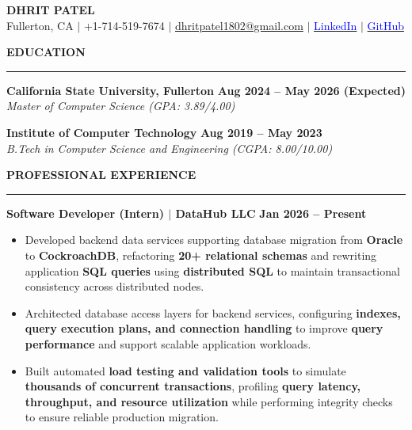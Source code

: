 \documentclass{article}
\begin{document}
\begin{center}
\thispagestyle{empty}

\large \textbf{DHRIT PATEL} \\
Fullerton, CA $\mid$ +1-714-519-7674 $\mid$
\href{mailto:dhritpatel1802@gmail.com}{dhritpatel1802@gmail.com} $\mid$
\href{https://www.linkedin.com/in/dhrit-patel-4a4135207/}{\textcolor{blue}{LinkedIn}} $\mid$
\href{https://github.com/d180}{\textcolor{blue}{GitHub}}

\end{center}

\noindent \textbf{EDUCATION} \vspace{-8pt} \\
\rule{\linewidth}{0.5pt}

\noindent \textbf{California State University, Fullerton} \hfill \textbf{Aug 2024 – May 2026 (Expected)} \\
\textit{Master of Computer Science (GPA: 3.89/4.00)}

\vspace{2mm}

\noindent \textbf{Institute of Computer Technology} \hfill \textbf{Aug 2019 – May 2023} \\
\textit{B.Tech in Computer Science and Engineering (CGPA: 8.00/10.00)}

\vspace{3mm}
\noindent \textbf{PROFESSIONAL EXPERIENCE} \vspace{-8pt} \\
\rule{\linewidth}{0.5pt}

{\large \noindent \textbf{Software Developer (Intern) $\mid$ DataHub LLC}} \hfill \textbf{Jan 2026 – Present}
\vspace{1mm}

{\small
\begin{itemize}[noitemsep, nolistsep, leftmargin=*, itemsep=1mm]

\item Developed backend data services supporting database migration from \textbf{Oracle} to \textbf{CockroachDB}, refactoring \textbf{20+ relational schemas} and rewriting application \textbf{SQL queries} using \textbf{distributed SQL} to maintain transactional consistency across distributed nodes.

\item Architected database access layers for backend services, configuring \textbf{indexes, query execution plans, and connection handling} to improve \textbf{query performance} and support scalable application workloads.

\item Built automated \textbf{load testing and validation tools} to simulate \textbf{thousands of concurrent transactions}, profiling \textbf{query latency, throughput, and resource utilization} while performing integrity checks to ensure reliable production migration.

\end{itemize}
}
\end{document}
